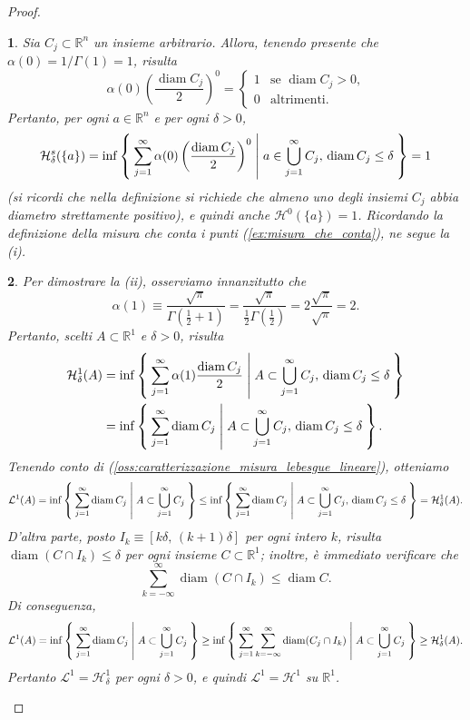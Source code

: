 \documentclass[a4paper,10pt,openright,oneside]{book}
\theoremstyle{theoremstyle}
\theoremstyle{theoremstylewoheader}
\theoremstyle{theoremstyle}
\theoremstyle{proofsecstyle}
\newtheorem{proofsec}{}
\theoremstyle{nonumberplain}
\newtheorem{proof}{Dim.}
\newcommand{\RR}{\ensuremath{\mathbb{R}}}
\newcommand{\Leb}{\ensuremath{\mathcal{L}}}
\newcommand{\Haus}{\ensuremath{\mathcal{H}}}
\DeclareMathOperator{\diam}{diam}
\begin{document}
\begin{proof}
\begin{proofsec}
Sia $C_j \subset \RR^n$ un insieme arbitrario. Allora, tenendo presente che $\alpha(0) = 1/\Gamma(1) = 1$, risulta
\[
\alpha(0)\left(\frac{\diam C_j}{2}\right)^0 =
\begin{cases}
1 & \text{se $\diam C_j > 0$,}\\
0 & \text{altrimenti.}
\end{cases}
\]
Pertanto, per ogni $a \in \RR^n$ e per ogni $\delta > 0$,
\[
\Haus_\delta^s (\{a\}) = \inf\Set{ \sum_{j=1}^\infty \alpha(0) \left(\frac{\diam C_j}{2}\right)^0 | a \in \bigcup_{j=1}^\infty C_j,\, \diam C_j \le \delta } = 1
\]
(si ricordi che nella definizione si richiede che almeno uno degli insiemi $C_j$ abbia diametro strettamente positivo), e quindi anche $\Haus^0(\{a\})= 1$. Ricordando la definizione della misura che conta i punti (\ref{ex:misura_che_conta}), ne segue la (i).
\end{proofsec}

\begin{proofsec}
Per dimostrare la (ii), osserviamo innanzitutto che
\[
\alpha(1) \equiv \frac{\sqrt{\pi}}{\Gamma(\frac{1}{2} + 1)} = \frac{\sqrt{\pi}}{\frac{1}{2}\Gamma(\frac{1}{2})} = 2 \frac{\sqrt{\pi}}{\sqrt{\pi}} = 2.
\]
Pertanto, scelti $A \subset \RR^1$ e $\delta > 0$, risulta
\begin{align*}
\Haus_\delta^1 (A) &= \inf\Set{ \sum_{j=1}^\infty \alpha(1) \frac{\diam C_j}{2} | A \subset \bigcup_{j=1}^\infty C_j,\, \diam C_j \le \delta }\\
&= \inf\Set{ \sum_{j=1}^\infty \diam C_j | A \subset \bigcup_{j=1}^\infty C_j,\, \diam C_j \le \delta }.
\end{align*}
Tenendo conto di (\ref{oss:caratterizzazione_misura_lebesgue_lineare}), otteniamo
\[
\Leb^1(A) = \inf\Set{ \sum_{j=1}^\infty \diam C_j | A \subset \bigcup_{j=1}^\infty C_j } \le \inf\Set{ \sum_{j=1}^\infty \diam C_j | A \subset \bigcup_{j=1}^\infty C_j,\, \diam C_j \le \delta } = \Haus_\delta^1 (A).
\]
D'altra parte, posto $I_k \equiv [k\delta,\, (k+1)\delta]$ per ogni intero $k$, risulta $\diam (C \cap I_k) \le \delta$ per ogni insieme $C \subset \RR^1$; inoltre, è immediato verificare che
\[
\sum_{k=-\infty}^\infty \diam (C \cap I_k) \le \diam C.
\]
Di conseguenza,
\[
\Leb^1(A) = \inf\Set{ \sum_{j=1}^\infty \diam C_j | A \subset \bigcup_{j=1}^\infty C_j } \ge \inf\Set{ \sum_{j=1}^\infty \sum_{k=-\infty}^\infty \diam (C_j \cap I_k) | A \subset \bigcup_{j=1}^\infty C_j } \ge \Haus_\delta^1 (A).
\]
Pertanto $\Leb^1 = \Haus_\delta^1$ per ogni $\delta > 0$, e quindi $\Leb^1 = \Haus^1$ su $\RR^1$.
\end{proofsec}


\end{proof}
\end{document}
